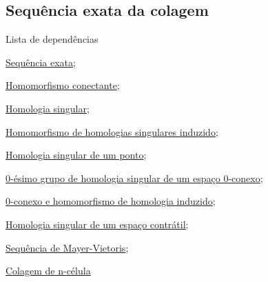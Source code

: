 \subsection{Sequência exata da colagem} %
\label{sequencia-exata-da-colagem-prop}
\begin{titlemize}{Lista de dependências}
    \item \hyperref[sequencia-exata-def]{Sequência exata};\\
    \item \hyperref[homomorfismo-conectante-def]{Homomorfismo conectante};\\
    \item \hyperref[homologia-singular-def]{Homologia singular};\\
    \item \hyperref[homomorfismo-de-homologias-singulares-induzido-prop]{Homomorfismo de homologias singulares induzido};\\
    \item \hyperref[homologia-singular-de-um-ponto-prop]{Homologia singular de um ponto};\\
    \item \hyperref[0-esimo-grupo-de-homologia-de-espaco-zero-conexo-prop]{0-ésimo grupo de homologia singular de um espaço 0-conexo};\\
    \item \hyperref[0-conexo-e-homomorfismo-de-homologia-induzido-prop]{0-conexo e homomorfismo de homologia induzido};\\
    \item \hyperref[homologia-singular-de-um-espaco-contratil-prop]{Homologia singular de um espaço contrátil};\\
    \item \hyperref[sequencia-de-mayer-vietoris-prop]{Sequência de Mayer-Vietoris};\\
    \item \hyperref[colagem-de-n-celula-def]{Colagem de n-célula}

    
    
\end{titlemize}

